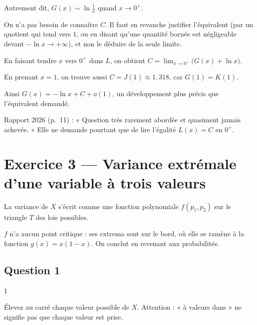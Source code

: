 \documentclass[11pt,a4paper]{article}
\begin{document}
Autrement dit, \(G(x)\sim\ln\frac1x\) quand \(x\to0^+\).

\begin{piege}

On n'a pas besoin de connaître \(C\). Il faut en revanche justifier l'équivalent (par un quotient qui tend vers \(1\), ou en disant qu'une quantité bornée est négligeable devant \(-\ln x\to+\infty\)), et non le déduire de la seule limite.

\end{piege}

\begin{methode}

En faisant tendre \(x\) vers \(0^+\) dans \(L\), on obtient \(C=\lim_{x\to0^+}\bigl(G(x)+\ln x\bigr)\).

En prenant \(x=1\), on trouve aussi \(C=J(1)\approx1{,}318\), car \(G(1)=K(1)\).

Ainsi \(G(x)=-\ln x+C+o(1)\), un développement plus précis que l'équivalent demandé.

\end{methode}

\begin{jury}

Rapport 2026 (p.~11) : « Question très rarement abordée et quasiment jamais achevée. » Elle ne demande pourtant que de lire l'égalité \(L(x)=C\) en \(0^+\).

\end{jury}

\hypertarget{exercice-3-variance-extruxe9male-dune-variable-uxe0-trois-valeurs}{%
\section{Exercice 3 --- Variance extrémale d'une variable à trois valeurs}\label{exercice-3-variance-extruxe9male-dune-variable-uxe0-trois-valeurs}}

La variance de \(X\) s'écrit comme une fonction polynomiale \(f(p_1,p_2)\) sur le triangle \(T\) des lois possibles.

\(f\) n'a aucun point critique : ses extrema sont sur le bord, où elle se ramène à la fonction \(g(x)=x(1-x)\). On conclut en revenant aux probabilités.

\hypertarget{question-1-2}{%
\subsection{Question 1}\label{question-1-2}}

\begin{indication}{1}

Élevez au carré chaque valeur possible de \(X\). Attention : « à valeurs dans » ne signifie pas que chaque valeur est prise.

\end{indication}
\end{document}
